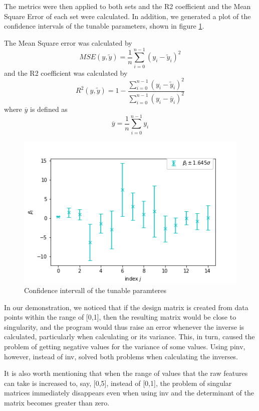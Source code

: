 \documentclass{article}
\begin{document}
The metrics were then applied to both sets and the R2 coefficient and the Mean Square Error of each set were calculated. In addition, we generated a plot of the confidence intervals of the tunable parameters, shown in figure \ref{fig:confint}.

The Mean Square error was calculated by
\begin{equation}\label{mse}
MSE(y,\tilde{y}) = \dfrac{1}{n}\sum_{i=0}^{n-1} (y_{i} - \tilde{y}_{i})^{2}
\end{equation}
and the R2 coefficient was calculated by
\begin{equation}\label{r2}
R^{2}(y,\tilde{y}) = 1 - \dfrac{\sum_{i=0}^{n-1} (y_{i} - \tilde{y}_{i})^{2}}{\sum_{i=0}^{n-1} (y_{i} - \overline{y}_{i})^{2}}
\end{equation}
where $\overline{y}$ is defined as
\begin{equation}
\overline{y} = \dfrac{1}{n} \sum_{i=0}^{n-1} y_{i}
\end{equation}
\begin{figure}
\includegraphics[scale=0.5]{confidenceintervall.png}
\centering
\caption{Confidence intervall of the tunable paramteres}
\label{fig:confint}
\end{figure}

In our demonstration, we noticed that if the design matrix is created from data points within the range of [0,1], then the resulting  matrix would be close to singularity, and the program would thus raise an error whenever the inverse is calculated, particularly when calculating  or its variance. This, in turn, caused the problem of getting negative values for the variance of some values. Using pinv, however, instead of inv, solved both problems when calculating the inverses.

It is also worth mentioning that when the range of values that the raw features can take is increased to, say, [0,5], instead of [0,1], the problem of singular matrices immediately disappears even when using inv and the determinant of the matrix  becomes greater than zero.
\end{document}
